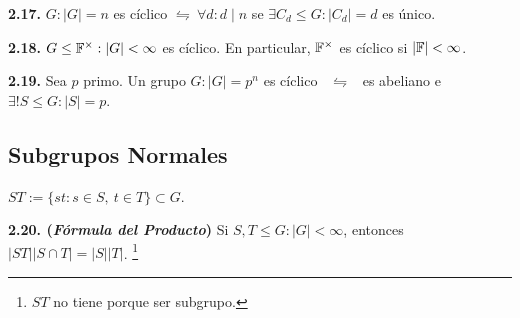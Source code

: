 
\begin{theorem}
    \textbf{2.17.} \(G : |G| = n\) es cíclico \(\leftrightharpoons \ \forall d : d  \mid  n \) se \(\exists  C_d \leq G : |C_d| = d\) es único.  
\end{theorem}


\begin{theorem}
    \textbf{2.18.} \(G\leq  \mathbb{F}^\times : |G| < \infty\) es cíclico. En particular, \(\mathbb{F}^\times\) es cíclico si \(|\mathbb{F}| < \infty \). 
\end{theorem}

\begin{theorem}
    \textbf{2.19.} Sea \(p\) primo. Un grupo \(G : |G| = p^n\) es cíclico \ \(\leftrightharpoons\) \ es abeliano e \(\exists ! S\leq G : |S| = p\).  
\end{theorem}

\subsection*{Subgrupos Normales}

\begin{definition}
    \centering \(ST := \{st : s \in S, \ t \in T\} \subset G\).   
\end{definition}

\begin{theorem}
    \textbf{2.20. (\emph{Fórmula del Producto})} Si \(S, T \leq G : |G|< \infty \), entonces \(|ST| |S \cap T| = |S||T|\). \footnote{\(ST\) no tiene porque ser subgrupo.} 
\end{theorem}

